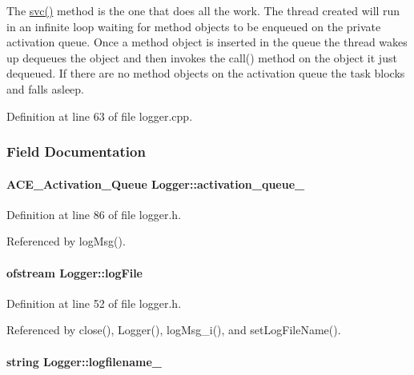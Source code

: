 The \hyperlink{classLogger_Loggera4}{svc()} method is the one that does all the work. The thread created will run in an infinite loop waiting for method objects to be enqueued on the private activation queue. Once a method object is inserted in the queue the thread wakes up dequeues the object and then invokes the call() method on the object it just dequeued. If there are no method objects on the activation queue the task blocks and falls asleep. 

Definition at line 63 of file logger.cpp.

\subsubsection{Field Documentation}
\hypertarget{classLogger_Loggero4}{
\paragraph[activation\_\-queue\_\-]{\setlength{\rightskip}{0pt plus 5cm}ACE\_\-Activation\_\-Queue Logger::activation\_\-queue\_\-}\hfill}
\label{classLogger_Loggero4}




Definition at line 86 of file logger.h.

Referenced by log\-Msg().\hypertarget{classLogger_Loggero2}{
\paragraph[logFile]{\setlength{\rightskip}{0pt plus 5cm}ofstream Logger::log\-File}\hfill}
\label{classLogger_Loggero2}




Definition at line 52 of file logger.h.

Referenced by close(), Logger(), log\-Msg\_\-i(), and set\-Log\-File\-Name().\hypertarget{classLogger_Loggero1}{
\paragraph[logfilename\_\-]{\setlength{\rightskip}{0pt plus 5cm}string Logger::logfilename\_\-}\hfill}
\label{classLogger_Loggero1}




